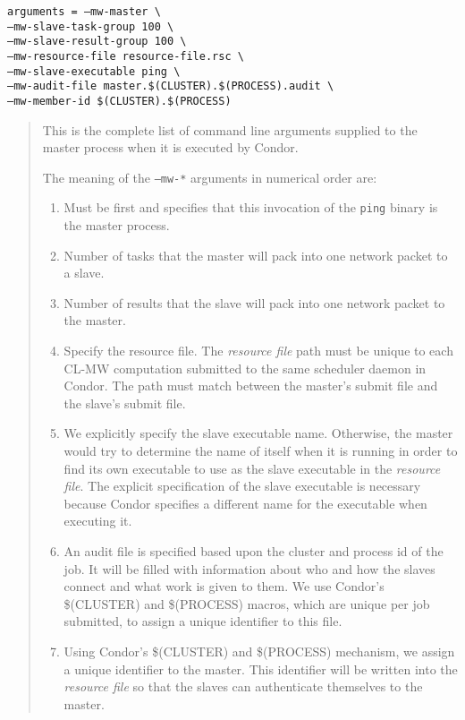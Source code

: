\documentclass[titlepage,12pt]{book}
\newcommand{\xsmall}{\latexhtml{\small}{}}
\newcommand{\xnormalsize}{\latexhtml{\normalsize}{}}
\newcommand{\clmw}{\xsmall\textsc{CL-MW}\xnormalsize\xspace}
\newcommand{\rfile}{\textit{resource file}\xspace}
\newcommand{\exec}[1]{\texttt{#1}\xspace}
\newenvironment{explainline}[1]
	{\noindent\texttt{#1}\begin{quotation}}
	{\end{quotation}}
\begin{document}
\begin{explainline}
{arguments = --mw-master \textbackslash \\ \indent
--mw-slave-task-group 100 \textbackslash \\ \indent
--mw-slave-result-group 100 \textbackslash \\ \indent
--mw-resource-file resource-file.rsc \textbackslash \\ \indent
--mw-slave-executable ping \textbackslash \\ \indent
--mw-audit-file master.\$(CLUSTER).\$(PROCESS).audit \textbackslash \\ \indent
--mw-member-id \$(CLUSTER).\$(PROCESS)}
This is the complete list of command line arguments supplied to the
master process when it is executed by Condor.

The meaning of the \texttt{--mw-*} arguments in numerical order are:
\begin{enumerate}
\item Must be first and specifies that this invocation of the \exec{ping}
	binary is the master process.
\item Number of tasks that the master will pack into one network
	packet to a slave.
\item Number of results that the slave will pack into one network
	packet to the master.
\item Specify the resource file.  The \rfile path must be unique to each
	\clmw computation submitted to the same scheduler daemon
	in Condor.  The path must match between the master's submit
	file and the slave's submit file.
\item We explicitly specify the slave executable name. Otherwise, the
	master would try to determine the name of itself when it is
	running in order to find its own executable to use as the
	slave executable in the \rfile. The explicit specification of the slave
	executable is necessary because Condor specifies a different
	name for the executable when executing it.
\item An audit file is specified based upon the cluster and process
	id of the job.	It will be filled with information about who
	and how the slaves connect and what work is given to them. We
	use Condor's \$(CLUSTER) and \$(PROCESS) macros, which are
	unique per job submitted, to assign a unique identifier to
	this file.
\item Using Condor's \$(CLUSTER) and \$(PROCESS) mechanism, we assign a
	unique identifier to the master. This identifier will be written into
	the \rfile so that the slaves can authenticate themselves to
	the master.
\end{enumerate}
\end{explainline}
\end{document}
